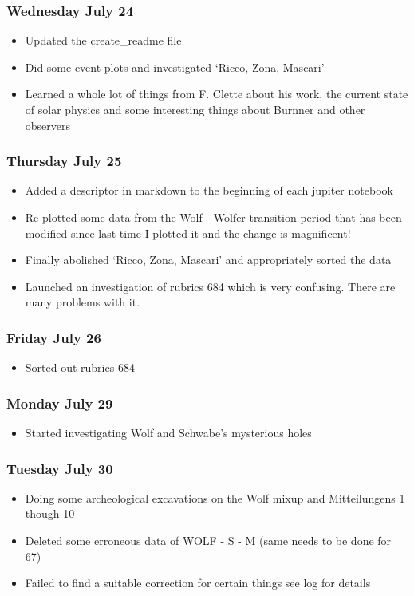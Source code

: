 \documentclass[12pt]{article}
\begin{document}
\subsubsection{Wednesday July 24}
\begin{itemize}
    \item Updated the create\_readme file
    \item Did some event plots and investigated `Ricco, Zona, Mascari'
    \item Learned a whole lot of things from F. Clette about his work, the current state of solar physics and some interesting things about Burnner and other observers
\end{itemize}

\subsubsection{Thursday July 25}
\begin{itemize}
    \item Added a descriptor in markdown to the beginning of each jupiter notebook
    \item Re-plotted some data from the Wolf - Wolfer transition period that has been modified since last time I plotted it and the change is magnificent! 
    \item Finally abolished `Ricco, Zona, Mascari' and appropriately sorted the data
    \item Launched an investigation of rubrics 684 which is very confusing. There are many problems with it.
\end{itemize}

\subsubsection{Friday July 26}
\begin{itemize}
    \item Sorted out rubrics 684
\end{itemize}

\subsubsection{Monday July 29}
\begin{itemize}
    \item Started investigating Wolf and Schwabe's mysterious holes
\end{itemize}

\subsubsection{Tuesday July 30}
\begin{itemize}
    \item Doing some archeological excavations on the Wolf mixup and Mitteilungens 1 though 10 
    \item Deleted some erroneous data of WOLF - S - M (same needs to be done for 67)
    \item Failed to find a suitable correction for certain things see log for details
\end{itemize}
\end{document}
